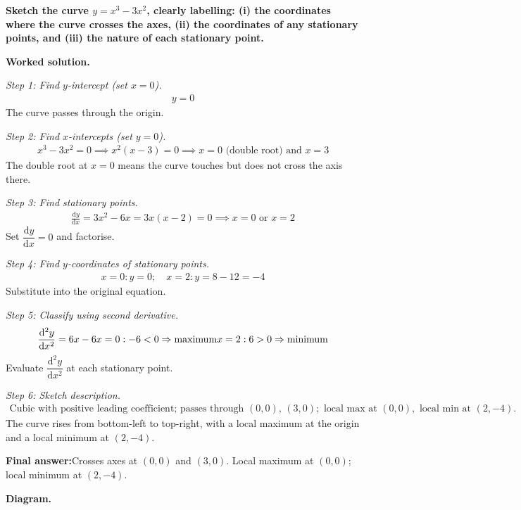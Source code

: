 \documentclass[11pt]{article}
\newcommand{\question}[1]{\par\medskip\noindent\textbf{#1}\par}
\begin{document}
\question{Sketch the curve \( y = x^3 - 3x^2 \), clearly labelling: (i) the coordinates where the curve crosses the axes, (ii) the coordinates of any stationary points, and (iii) the nature of each stationary point.}

\textbf{Worked solution.}

\textit{Step 1: Find \( y \)-intercept (set \( x = 0 \)).}
\[\begin{gathered}
y = 0
\end{gathered}\]
The curve passes through the origin.

\textit{Step 2: Find \( x \)-intercepts (set \( y = 0 \)).}
\[\begin{gathered}
x^3 - 3x^2 = 0 \implies x^2(x - 3) = 0 \implies x = 0 \text{ (double root) and } x = 3
\end{gathered}\]
The double root at \( x = 0 \) means the curve touches but does not cross the axis there.

\textit{Step 3: Find stationary points.}
\[\begin{gathered}
\frac{\mathrm{d}y}{\mathrm{d}x} = 3x^2 - 6x = 3x(x-2) = 0 \implies x = 0 \text{ or } x = 2
\end{gathered}\]
Set \( \dfrac{\mathrm{d}y}{\mathrm{d}x} = 0 \) and factorise.

\textit{Step 4: Find \( y \)-coordinates of stationary points.}
\[\begin{gathered}
x=0: y=0; \quad x=2: y = 8 - 12 = -4
\end{gathered}\]
Substitute into the original equation.

\textit{Step 5: Classify using second derivative.}
\[\begin{gathered}
\frac{\mathrm{d}^2y}{\mathrm{d}x^2} = 6x - 6 \newline x=0: -6 < 0 \Rightarrow \text{maximum} \newline x=2: 6 > 0 \Rightarrow \text{minimum}
\end{gathered}\]
Evaluate \( \dfrac{\mathrm{d}^2y}{\mathrm{d}x^2} \) at each stationary point.

\textit{Step 6: Sketch description.}
\[\begin{gathered}
\text{Cubic with positive leading coefficient; passes through } (0,0),\, (3,0); \text{ local max at } (0,0),\text{ local min at } (2,-4).
\end{gathered}\]
The curve rises from bottom-left to top-right, with a local maximum at the origin and a local minimum at \( (2,-4) \).

\begin{answerbox}
\textbf{Final answer:}\quad Crosses axes at \(\displaystyle  (0, 0) \) and \(\displaystyle  (3, 0) \). Local maximum at \(\displaystyle  (0, 0) \); local minimum at \(\displaystyle  (2, -4) \).
\end{answerbox}
\textbf{Diagram.}
\end{document}
